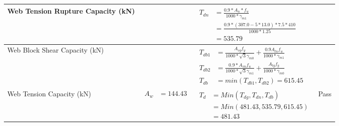 \documentclass{article}%
\begin{document}
\begin{longtable}{|p{4cm}|p{6cm}|p{5.5cm}|p{1.5cm}|}
\hline%
Web Tension Rupture Capacity (kN)&&$\begin{aligned} T_{dn} &= \frac{0.9*A_{n}*f_u}{1000*\gamma_{m1}}\\ &=\frac{0.9*(307.0-5*13.0)*7.5*410}{1000*1.25}\\ &=535.79\end{aligned}$&\\%
\hline%
Web Block Shear Capacity (kN)&&$\begin{aligned}T_{db1} &= \frac{A_{vg} f_{y}}{1000*\sqrt{3} \gamma_{m0}} + \frac{0.9 A_{tn} f_{u}}{1000*\gamma_{m1}}\\ T_{db2} &= \frac{0.9*A_{vn} f_{u}}{1000*\sqrt{3} \gamma_{m1}} + \frac{A_{tg} f_{y}}{1000*\gamma_{m0}}\\ T_{db} &= min(T_{db1}, T_{db2})= 615.45\end{aligned}$&\\%
\hline%
Web Tension Capacity (kN)&$\begin{aligned} A_w &=144.43 \end{aligned}$&$\begin{aligned} T_d &= Min(T_{dg},T_{dn},T_{db})\\ &= Min(481.43,535.79,615.45)\\ &=481.43\end{aligned}$&Pass\\%
\hline%
\end{longtable}

%
\newpage%
\end{document}
